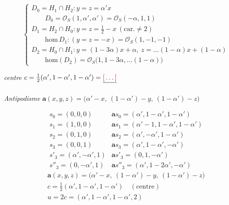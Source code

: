 \documentclass[11pt,a4paper]{article}
\begin{document}
\[
\begin{cases}
D_0 = H_1 \cap H_2 : y = z = \alpha' x \\ \qquad D_0 = \mathcal{O}_S(1, \alpha', \alpha') = \mathcal{O}_S(-\alpha, 1, 1) \\
D_1 = H_2 \cap H_0 : y = z = \tfrac12 - x \ (\text{car.} \neq 2) \\ \qquad \mathrm{hom}\,D_1 : (y = z = -x) = \mathcal{O}_S(1, -1, -1) \\
D_2 = H_0 \cap H_1 : y = (1-3\alpha)x + \alpha,\ z = \ldots(1-\alpha)x + (1-\alpha) \\ \qquad \mathrm{hom}(D_2) = \mathcal{O}_S\bigl(1, 1-3\alpha, \ldots(1-\alpha)\bigr)
\end{cases}
\]

\emph{centre} \quad $c = \tfrac12(\alpha', 1-\alpha', 1-\alpha') = \struck{\ill{}}$

\emph{Antipodisme} \quad $\mathbf{a}(x,y,z) = \bigl(\alpha' - x,\ (1-\alpha') - y,\ (1-\alpha') - z\bigr)$

\[
\begin{array}{ll}
s_0 = (0,0,0) & \mathbf{a}s_0 = (\alpha', 1-\alpha', 1-\alpha') \\
s_1 = (1,0,0) & \mathbf{a}s_1 = (\alpha'-1, 1-\alpha', 1-\alpha') \\
s_2 = (0,1,0) & \mathbf{a}s_2 = (\alpha', -\alpha', 1-\alpha') \\
s_3 = (0,0,1) & \mathbf{a}s_3 = (\alpha', 1-\alpha', -\alpha') \\
s'_3 = (\alpha', -\alpha', 1) & \mathbf{a}s'_3 = (0, 1, -\alpha') \\
s''_3 = (0, -\alpha', 1) & \mathbf{a}s''_3 = (\alpha', 1-2\alpha', -\alpha')
\end{array}
\]
\[
\begin{array}{l}
\mathbf{a}(x,y,z) = \bigl(\alpha' - x,\ (1-\alpha') - y,\ (1-\alpha') - z\bigr) \\[1ex]
c = \tfrac12(\alpha', 1-\alpha', 1-\alpha') \quad (\text{centre}) \\[1ex]
u = 2c = (\alpha', 1-\alpha', 1-\alpha', 2)
\end{array}
\]
\end{document}
